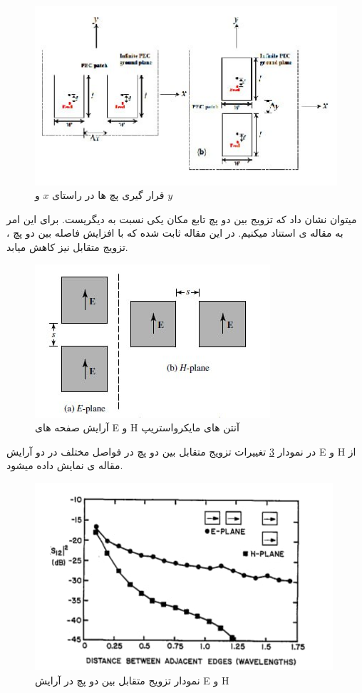 \begin{figure}
	\centering
	\includegraphics[scale=1.5]{Images/fig17.jpg}
	\caption{قرار گیری پچ ها در راستای 
		$x$ 
		و 
		$y$}
	\label{fig17}
\end{figure}

میتوان نشان داد که تزویج بین دو پچ تابع مکان یکی نسبت به دیگریست. برای این امر به مقاله ی
\cite{carver1981microstrip}
 استناد میکنیم. در این مقاله ثابت شده که با افزایش فاصله بین دو پچ ، تزویج متقابل نیز کاهش میابد. 

\begin{figure}
	\centering
	\includegraphics[scale=1.5]{Images/fig18.jpg}
	\caption{آرایش صفحه های E و H آنتن های مایکرواستریپ}
	\label{fig18}
\end{figure}

در نمودار 
\ref{fig19}
 تغییرات تزویج متقابل بین دو پچ در فواصل مختلف در دو آرایش E و H از مقاله ی 
 \cite{carver1981microstrip}
  نمایش داده میشود. 

\begin{figure}
	\centering
	\includegraphics[scale=1]{Images/fig19.jpg}
	\caption{نمودار تزویج متقابل بین دو پچ در آرایش E و H}
	\label{fig19}
\end{figure}


